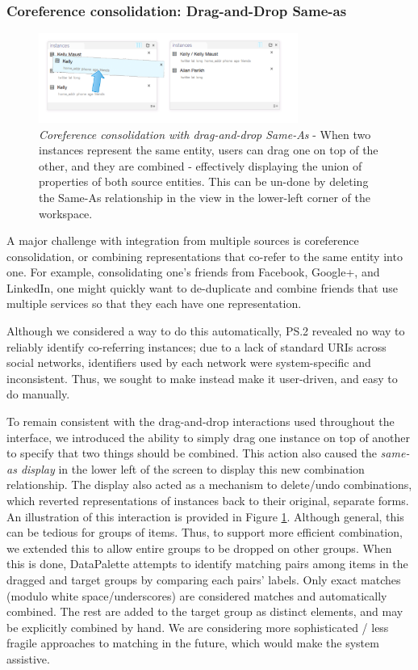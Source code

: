 \documentclass{sigchi}
\begin{document}
\subsubsection{Coreference consolidation: Drag-and-Drop Same-as}

\begin{figure}[htbp]
\begin{center}
\includegraphics[width=8.5cm]{img/sameas}
\caption{\emph{Coreference consolidation with drag-and-drop Same-As} - When two instances represent the same entity, users can drag one on top of the other, and they are combined - effectively displaying the union of properties of both source entities. This can be un-done by deleting the Same-As relationship in the view in the lower-left corner of the workspace.}
\label{fig:sameas}
\end{center}
\end{figure}

A major challenge with integration from multiple sources is coreference consolidation, or combining representations that co-refer to the same entity into one.  For example, consolidating one's friends from Facebook, Google+, and LinkedIn, one might quickly want to de-duplicate and combine friends that use multiple services so that they each have one representation.

Although we considered a way to do this automatically, PS.2 revealed no way to reliably identify co-referring instances; due to a lack of standard URIs across social networks, identifiers used by each network were system-specific and inconsistent. Thus, we sought to make instead make it user-driven, and easy to do manually.  

To remain consistent with the drag-and-drop interactions used throughout the interface, we introduced the ability to simply drag one instance on top of another to specify that two things should be combined.  This action also caused the \emph{same-as display} in the lower left of the screen to display this new combination relationship.  The display also acted as a mechanism to delete/undo combinations, which reverted representations of instances back to their original, separate forms. An illustration of this interaction is provided in Figure \ref{fig:sameas}. Although general, this can be tedious for groups of items.  Thus, to support more efficient combination, we extended this to allow entire groups to be dropped on other groups.  When this is done, DataPalette attempts to identify matching pairs among items in the dragged and target groups by comparing each pairs' labels.  Only exact matches (modulo white space/underscores) are considered matches and automatically combined.  The rest are added to the target group as distinct elements, and may be explicitly combined by hand.  We are considering more sophisticated / less fragile approaches to matching in the future, which would make the system assistive. 
\end{document}
